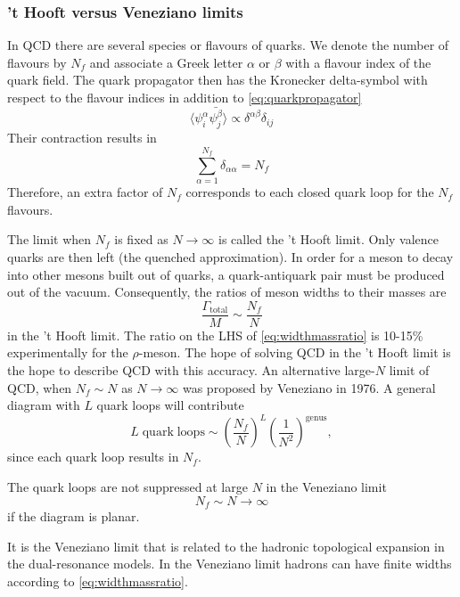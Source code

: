 \subsubsection{'t Hooft versus Veneziano limits}
In QCD there are several species or flavours of quarks. We denote the number
of flavours by $N_f$ and associate a Greek letter $\alpha$ or $\beta$ with a
flavour index of the quark field.
The quark propagator then has the Kronecker delta-symbol with respect to the
flavour indices in addition to \eqref{eq:quarkpropagator}
\begin{equation}
  \langle\psi^\alpha_i\bar{\psi^\beta_j}\rangle\propto
\delta^{\alpha\beta}\delta_{ij}
\end{equation}
Their contraction results in
\begin{equation}
  \sum_{\alpha=1}^{N_f}\delta_{\alpha\alpha} = N_f
\end{equation}
Therefore,  an extra factor of $N_f$ corresponds to each closed quark loop
for the $N_f$ flavours.
\par The limit when $N_f$ is fixed as $N\rightarrow\infty$ is called the 't
Hooft limit. Only valence quarks are then left (the quenched approximation). 
In order for a meson to decay into other mesons built out of quarks,
a quark-antiquark pair must be produced out of the vacuum. Consequently, the 
ratios of meson widths to their masses are
\begin{equation}
  \frac{\Gamma_{\mathrm{total}}}{M}\sim \frac{N_f}{N}
  \label{eq:widthmassratio}
\end{equation}
in the 't Hooft limit. The ratio on the LHS of \eqref{eq:widthmassratio} is 
10-15\% experimentally for the $\rho$-meson. The hope of solving QCD in the
't Hooft limit is the hope to describe QCD with this accuracy. An alternative
large-$N$ limit of QCD, when $N_f\sim N$ as $N\rightarrow\infty$ was proposed
by Veneziano in 1976. A general diagram with $L$ quark loops will contribute
\begin{equation}
L\;\mathrm{quark\;loops}\sim\left(\frac{N_f}{N}\right)^L\left(\frac{1}{N^2}\right)^\mathrm{genus},
\end{equation}
since each quark loop results in $N_f$.
\par The quark loops are not suppressed at large $N$ in the Veneziano limit
\begin{equation}
N_f\sim N\rightarrow\infty
\end{equation}
if the  diagram is planar. 
\par It is the Veneziano limit that is related to the hadronic topological
expansion in the dual-resonance models. In the Veneziano limit hadrons can have
finite widths according to \eqref{eq:widthmassratio}.
